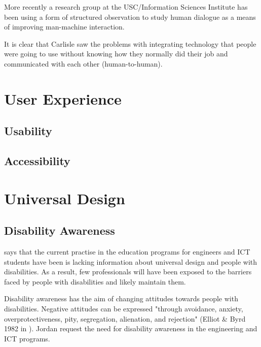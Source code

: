 \begin{displayquote}
    More recently a research group at the USC/Information Sciences Institute has been using a form of structured observation to study human dialogue as a means of improving man-machine interaction.
\end{displayquote}

It is clear that Carlisle saw the problems with integrating technology that people were going to use without knowing how they normally did their job and communicated with each other (human-to-human).
\section{User Experience}
\subsection{Usability}
\subsection{Accessibility}
\section{Universal Design}
\subsection{Disability Awareness}
\textcite{Jordan2010} says that the current practise in the education programs for engineers and ICT students have been is lacking information about universal design and people with disabilities. As a result, few professionals will have been exposed to the barriers faced by people with disabilities and likely maintain them. 

Disability awareness has the aim of changing attitudes towards people with disabilities. Negative attitudes can be expressed "through avoidance, anxiety, overprotectiveness, pity, segregation, alienation, and rejection" (Elliot \& Byrd 1982 in \cite{Jordan2010}). Jordan request the need for disability awareness in the engineering and ICT programs.

